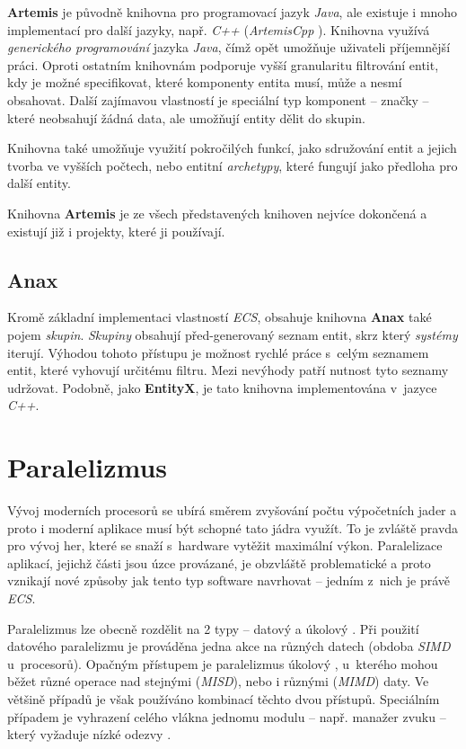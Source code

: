 \textbf{Artemis} \cite{ArtemisJava} je původně knihovna pro programovací jazyk \emph{Java}, ale existuje i mnoho implementací pro další jazyky, např. \emph{C++} (\emph{ArtemisCpp} \cite{ArtemisCpp}). Knihovna využívá \emph{generického programování} jazyka \emph{Java}, čímž opět umožňuje uživateli příjemnější práci. Oproti ostatním knihovnám podporuje vyšší granularitu filtrování entit, kdy je možné specifikovat, které komponenty entita musí, může a nesmí obsahovat. Další zajímavou vlastností je speciální typ komponent -- značky -- které neobsahují žádná data, ale umožňují entity dělit do skupin. 

Knihovna také umožňuje využití pokročilých funkcí, jako sdružování entit a jejich tvorba ve vyšších počtech, nebo entitní \emph{archetypy}, které fungují jako předloha pro další entity.

Knihovna \textbf{Artemis} je ze všech představených knihoven nejvíce dokončená a existují již i projekty, které ji používají.

\subsection{Anax}

Kromě základní implementaci vlastností \emph{ECS}, obsahuje knihovna \textbf{Anax} \cite{Anax} také pojem \emph{skupin}. \emph{Skupiny} obsahují před-generovaný seznam entit, skrz který \emph{systémy} iterují. Výhodou tohoto přístupu je možnost rychlé práce s~celým seznamem entit, které vyhovují určitému filtru. Mezi nevýhody patří nutnost tyto seznamy udržovat. Podobně, jako \textbf{EntityX}, je tato knihovna implementována v~jazyce \emph{C++}. 

\section{Paralelizmus}
\label{Chap:Parallelism}

Vývoj moderních procesorů se ubírá směrem zvyšování počtu výpočetních jader \cite{CPUPerfHistory} a proto i moderní aplikace musí být schopné tato jádra využít. To je zvláště pravda pro vývoj her, které se snaží s~hardware vytěžit maximální výkon. Paralelizace aplikací, jejichž části jsou úzce provázané, je obzvláště problematické a proto vznikají nové způsoby jak tento typ software navrhovat -- jedním z~nich je právě \emph{ECS}. 

Paralelizmus lze obecně rozdělit na 2 typy -- datový a úkolový \cite{KindsOfParallelism}. Při použití datového paralelizmu je prováděna jedna akce na různých datech (obdoba \emph{SIMD} u~procesorů). Opačným přístupem je paralelizmus úkolový \cite{TaskBasedParallelism}, u~kterého mohou běžet různé operace nad stejnými (\emph{MISD}), nebo i různými (\emph{MIMD}) daty. Ve většině případů je však používáno kombinací těchto dvou přístupů. Speciálním případem je vyhrazení celého vlákna jednomu modulu -- např. manažer zvuku -- který vyžaduje nízké odezvy \cite{FrontierThreads}.

